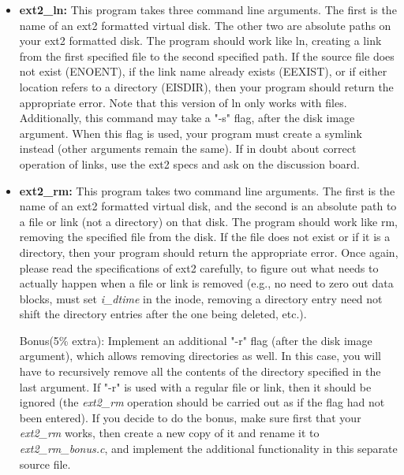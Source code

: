 \documentclass[12pt]{article}
\begin{document}
\begin{itemize}
    \item \textbf{ext2\_ln:} This program takes three command line arguments. The
    first is the name of an ext2 formatted virtual disk. The other two are absolute
    paths on your ext2 formatted disk. The program should work like ln, creating
    a link from the first specified file to the second specified path. If the
    source file does not exist (ENOENT), if the link name already exists
    (EEXIST), or if either location refers to a directory (EISDIR), then your
    program should return the appropriate error. Note that this version of ln
    only works with files. Additionally, this command may take a "-s" flag,
    after the disk image argument. When this flag is used, your program must
    create a symlink instead (other arguments remain the same). If in doubt
    about correct operation of links, use the ext2 specs and ask on the discussion
    board.

    \item \textbf{ext2\_rm:} This program takes two command line arguments. The
    first is the name of an ext2 formatted virtual disk, and the second is an
    absolute path to a file or link (not a directory) on that disk. The program
    should work like rm, removing the specified file from the disk. If the file
    does not exist or if it is a directory, then your program should return the
    appropriate error. Once again, please read the specifications of ext2
    carefully, to figure out what needs to actually happen when a file or link
    is removed (e.g., no need to zero out data blocks, must set \textit{i\_dtime} in the
    inode, removing a directory entry need not shift the directory entries after
    the one being deleted, etc.).

    \bigskip

    Bonus(5\% extra): Implement an additional "-r" flag (after the disk image argument),
    which allows removing directories as well. In this case, you will have to recursively
    remove all the contents of the directory specified in the last argument. If "-r" is
    used with a regular file or link, then it should be ignored (the \textit{ext2\_rm}
    operation should be carried out as if the flag had not been entered). If you
    decide to do the bonus, make sure first that your \textit{ext2\_rm} works, then create
    a new copy of it and rename it to \textit{ext2\_rm\_bonus.c}, and implement the
    additional functionality in this separate source file.
\end{itemize}
\end{document}

